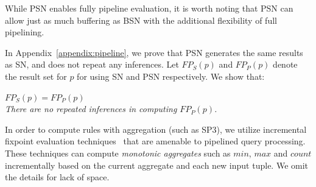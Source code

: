 While PSN enables fully pipeline evaluation, it is worth noting that PSN
can allow just as much buffering as BSN with the additional flexibility
of full pipelining.





 
In Appendix~\ref{appendix:pipeline}, we prove that PSN generates the same results as SN,
and does not repeat any inferences.
Let $FP_{S}(p)$ and $FP_{P}(p)$ denote the result set for $p$ for
using SN and PSN respectively. We show that:

\vspace{1pt}
 {\em $FP_{S}(p)=FP_{P}(p)$}\\
 {\em There are no
  repeated inferences in computing $FP_{P}(p)$.} 
\vspace{1pt}

In order to compute rules with aggregation (such as SP3), we utilize incremental
fixpoint evaluation techniques~\cite{rossAggregate} that are amenable to
pipelined query processing. These techniques can compute {\em monotonic
  aggregates} such as $min$, $max$ and $count$
incrementally based on the current aggregate and each new input tuple. 
We omit the details for lack of space.



